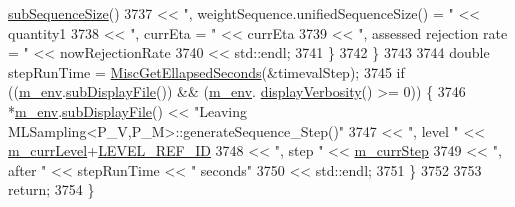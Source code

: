 \begin{DoxyCode}
      \hyperlink{class_q_u_e_s_o_1_1_scalar_sequence_a0288ea295eedc216a1617b3286f6f3a0}{subSequenceSize}()
3737                                 << \textcolor{stringliteral}{", weightSequence.unifiedSequenceSize() = "} << quantity1
3738                                 << \textcolor{stringliteral}{", currEta = "}                              << currEta
3739                                 << \textcolor{stringliteral}{", assessed rejection rate = "}              << nowRejectionRate
3740                                 << std::endl;
3741       \}
3742     \}
3743 
3744   \textcolor{keywordtype}{double} stepRunTime = \hyperlink{namespace_q_u_e_s_o_a424bc33f2e6e287fd468408d14b772ee}{MiscGetEllapsedSeconds}(&timevalStep);
3745   \textcolor{keywordflow}{if} ((\hyperlink{class_q_u_e_s_o_1_1_m_l_sampling_a13f1ca4fe9f94822fe572a743eaced1d}{m\_env}.\hyperlink{class_q_u_e_s_o_1_1_base_environment_a8a0064746ae8dddfece4229b9ad374d6}{subDisplayFile}()) && (\hyperlink{class_q_u_e_s_o_1_1_m_l_sampling_a13f1ca4fe9f94822fe572a743eaced1d}{m\_env}.
      \hyperlink{class_q_u_e_s_o_1_1_base_environment_a1fe5f244fc0316a0ab3e37463f108b96}{displayVerbosity}() >= 0)) \{
3746     *\hyperlink{class_q_u_e_s_o_1_1_m_l_sampling_a13f1ca4fe9f94822fe572a743eaced1d}{m\_env}.\hyperlink{class_q_u_e_s_o_1_1_base_environment_a8a0064746ae8dddfece4229b9ad374d6}{subDisplayFile}() << \textcolor{stringliteral}{"Leaving MLSampling<P\_V,P\_M>::generateSequence\_Step()"}
3747                             << \textcolor{stringliteral}{", level "} << \hyperlink{class_q_u_e_s_o_1_1_m_l_sampling_af9416874c856e50f3b35270e801f17e4}{m\_currLevel}+\hyperlink{_m_l_sampling_level_options_8h_a68d15eaf394d210effcf584b938206d3}{LEVEL\_REF\_ID}
3748                             << \textcolor{stringliteral}{", step "}  << \hyperlink{class_q_u_e_s_o_1_1_m_l_sampling_a1b1f8ccb4823bdfa26ec652f0807c63e}{m\_currStep}
3749                             << \textcolor{stringliteral}{", after "} << stepRunTime << \textcolor{stringliteral}{" seconds"}
3750                             << std::endl;
3751   \}
3752 
3753   \textcolor{keywordflow}{return};
3754 \}
\end{DoxyCode}
